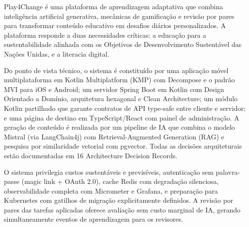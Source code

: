 \abstractPT  %

Play4Change é uma plataforma de aprendizagem adaptativa que combina inteligência artificial generativa, mecânicas de gamificação e revisão por pares para transformar conteúdo educativo em desafios diários personalizados. A plataforma responde a duas necessidades críticas: a educação para a sustentabilidade alinhada com os Objetivos de Desenvolvimento Sustentável das Nações Unidas, e a literacia digital.

Do ponto de vista técnico, o sistema é constituído por uma aplicação móvel multiplataforma em Kotlin Multiplatform (KMP) com Decompose e o padrão MVI para iOS e Android; um servidor Spring Boot em Kotlin com Design Orientado a Domínio, arquitetura hexagonal e Clean Architecture; um módulo Kotlin partilhado que garante contratos de API type-safe entre cliente e servidor; e uma página de destino em TypeScript/React com painel de administração. A geração de conteúdo é realizada por um pipeline de IA que combina o modelo Mistral (via LangChain4j) com Retrieval-Augmented Generation (RAG) e pesquisa por similaridade vetorial com pgvector. Todas as decisões arquiteturais estão documentadas em 16 Architecture Decision Records.

O sistema privilegia custos sustentáveis e previsíveis, autenticação sem palavra-passe (magic link + OAuth 2.0), cache Redis com degradação silenciosa, observabilidade completa com Micrometer e Grafana, e preparação para Kubernetes com gatilhos de migração explicitamente definidos. A revisão por pares das tarefas aplicadas oferece avaliação sem custo marginal de IA, gerando simultaneamente eventos de aprendizagem para os revisores.

